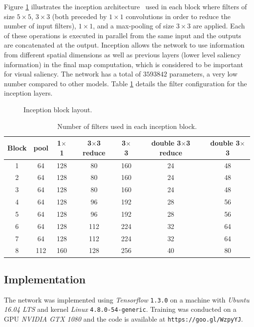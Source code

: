 \documentclass[10pt,twocolumn,letterpaper]{article}
\begin{document}
Figure \ref{fig:newinception} illustrates the inception
architecture~\cite{szegedy_2014}
used in each block where filters of size $5 \times 5$, $3 \times 3$
(both preceded by $1\times 1$ convolutions in order to reduce the number
of input filters), $1 \times 1$, and a max-pooling of size $3 \times 3$ are applied.
Each of these operations is executed in parallel from the same input
and the outputs are concatenated at the output.
Inception allows the network to use
information from different spatial dimensions as well as previous
layers (lower level saliency information) in the final map
computation, which is considered to be important for visual saliency.
The network has a total of $3593842$ parameters, a very low number
compared to other models.
Table \ref{table:inception} details the filter configuration for the
inception layers.

\begin{figure}[!htb]
    \centering
    \def\svgwidth{\linewidth}
    
    \caption{Inception block layout.}
   \label{fig:newinception}
\end{figure}

\begin{table}
\begin{center}
\small
\label{table:inception}
\caption{Number of filters used in each inception block.}
\begin{tabular}{|c|c|c|c|c|c|c|}
	\hline
    Block & pool & 1$\times$1 & 3$\times$3 reduce &
    3$\times$3 & double 3$\times$3 reduce & double 3$\times$3\\
    \hline
    1 & 64 & 128 & 80 & 160 & 24 & 48\\
    \hline
    2 & 64 & 128 & 80 & 160 & 24 & 48\\
    \hline
    3 & 64 & 128 & 80 & 160 & 24 & 48\\
    \hline
    4 & 64 & 128 & 96 & 192 & 28 & 56\\
    \hline
    5 & 64 & 128 & 96 & 192 & 28 & 56\\
    \hline
    6 & 64 & 128 & 112 & 224 & 32 & 64\\
    \hline
    7 & 64 & 128 & 112 & 224 & 32 & 64\\
    \hline
    8 & 112 & 160 & 128 & 256 & 40 & 80\\
    \hline
\end{tabular}
\end{center}
\end{table}

\subsection{Implementation}
The network was implemented using \emph{Tensorflow} \texttt{1.3.0}
on a machine with \emph{Ubuntu 16.04 LTS} and
kernel \emph{Linux} \texttt{4.8.0-54-generic}.
Training was conducted on a GPU \emph{NVIDIA GTX 1080} and the
code is available at \texttt{https://goo.gl/WzpyYJ}.
\end{document}
